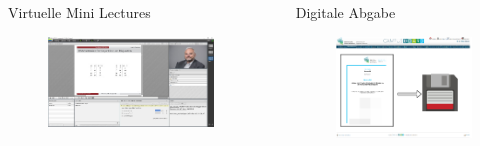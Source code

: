 \documentclass[final,hyperref={pdfpagelabels=false}]{beamer}
\begin{document}
\begin{frame}[t]
\begin{columns}[t]
\begin{column}{.465\textwidth}
\begin{block}{Virtuelle Mini Lectures}
    \begin{figure}
        \centering
        \includegraphics[width=0.98\linewidth]{imagesExample/ConnectOberflaeche1}
        \label{fig:itasprechstundenlayout}
    \end{figure}

\end{block}


\end{column} %

\begin{column}{.03\textwidth}\end{column} %

\begin{column}{.465\textwidth} %



\begin{block}{Digitale Abgabe}

    \begin{figure}
        \centering
        \includegraphics[width=0.7\linewidth]{imagesExample/digitaleAbgabe2}
        \label{fig:disgitaleabgabe}
    \end{figure}


\end{block}
\end{column}
\end{columns}
\end{frame}
\end{document}
